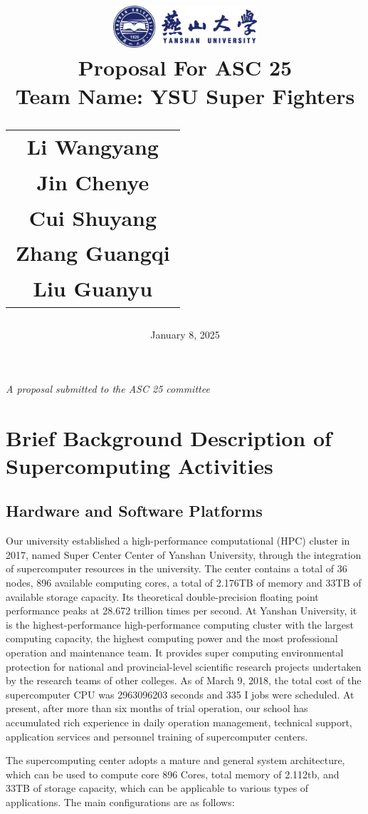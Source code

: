 \documentclass[a4paper,12pt]{article}
\title{
    \includegraphics[width=0.4\textwidth]{ysu-logo.png}\\[1cm] %
    {\LARGE Proposal For ASC 25}\\[0.5cm]
    \large Team Name: YSU Super Fighters\\[1cm] %
    \begin{tabular}{c}
        \large Li Wangyang \\
        \large Jin Chenye \\
        \large Cui Shuyang \\
        \large Zhang Guangqi \\
        \large Liu Guanyu
    \end{tabular}
}
\author{}
\date{\vfill January 8, 2025}
\begin{document}
\maketitle
\thispagestyle{empty}
\vfill
\begin{center}
    \textit{A proposal submitted to the ASC 25 committee}
\end{center}
\newpage

\tableofcontents
{}
\newpage

\section{Brief Background Description of Supercomputing Activities}

\subsection{Hardware and Software Platforms}
Our university established a high-performance computational (HPC) cluster in 2017, named Super Center Center of Yanshan University, through the integration of supercomputer resources in the university. The center contains a total of 36 nodes, 896 available computing cores, a total of 2.176TB of memory and 33TB of available storage capacity. Its theoretical double-precision floating point performance peaks at 28.672 trillion times per second. At Yanshan University, it is the highest-performance high-performance computing cluster with the largest computing capacity, the highest computing power and the most professional operation and maintenance team. It provides super computing environmental protection for national and provincial-level scientific research projects undertaken by the research teams of other colleges. As of March 9, 2018, the total cost of the supercomputer CPU was 2963096203 seconds and 335 I jobs were scheduled. At present, after more than six months of trial operation, our school has accumulated rich experience in daily operation management, technical support, application services and personnel training of supercomputer centers.

The supercomputing center adopts a mature and general system architecture, which can be used to compute core 896 Cores, total memory of 2.112tb, and 33TB of storage capacity, which can be applicable to various types of applications. The main configurations are as follows:
\end{document}
